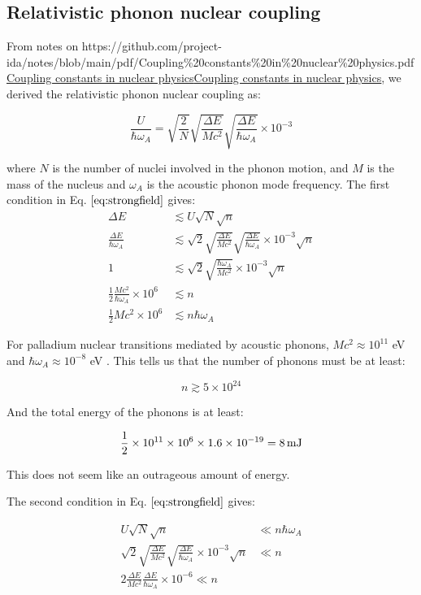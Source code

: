 \documentclass[
]{article}
\let\oldhref\href
\renewcommand{\href}[2]{\ifx#1\urlprefix\oldhref{#1}{#2}\else\uline{\oldhref{#1}{#2}}\fi}
\renewcommand{\[}{\begin{equation}}
\renewcommand{\]}{\end{equation}}
\begin{document}
\subsection{Relativistic phonon nuclear
coupling}\label{relativistic-phonon-nuclear-coupling}

From notes on
\href{https://github.com/project-ida/notes/blob/main/pdf/Coupling\%20constants\%20in\%20nuclear\%20physics.pdf}{Coupling
constants in nuclear physics}, we derived the relativistic phonon
nuclear coupling as:

\[
\frac{U}{\hbar \omega_A} = \sqrt{\frac{2}{N}} \sqrt{\frac{\Delta E}{M c^2}} \sqrt{\frac{\Delta E}{\hbar \omega_A}} \times 10^{-3}
\label{eq:phononcoupling}
\]

where \(N\) is the number of nuclei involved in the phonon motion, and
\(M\) is the mass of the nucleus and \(\omega_A\) is the acoustic phonon
mode frequency. The first condition in Eq. \(\ref{eq:strongfield}\)
gives: \[
\begin{aligned}
\Delta E &\lesssim U\sqrt{N}\sqrt{n} \\
\frac{\Delta E}{\hbar \omega_A} &\lesssim \sqrt{2} \sqrt{\frac{\Delta E}{M c^2}} \sqrt{\frac{\Delta E}{\hbar \omega_A}} \times 10^{-3}\sqrt{n} \\
1 &\lesssim \sqrt{2} \sqrt{\frac{\hbar\omega_A}{M c^2}} \times 10^{-3}\sqrt{n} \\
\frac{1}{2}\frac{Mc^2}{\hbar\omega_A}\times 10^6 &\lesssim n \\
\frac{1}{2}Mc^2\times 10^6  &\lesssim n\hbar\omega_A
\end{aligned}
\label{eq:strongfieldconditiononn}
\]

For palladium nuclear transitions mediated by acoustic phonons,
\(M c^2 \approx 10^{11}\) eV and \(\hbar \omega_A \approx 10^{-8}\) eV .
This tells us that the number of phonons must be at least:

\[
n \gtrsim 5\times 10^{24}
\]

And the total energy of the phonons is at least:

\[
\frac{1}{2}\times 10^{11} \times 10^{6} \times 1.6\times 10^{-19} = 8 \, \rm mJ
\label{eq:minfieldenergy}
\]

This does not seem like an outrageous amount of energy.

The second condition in Eq. \(\ref{eq:strongfield}\) gives:

\[
\begin{aligned}
U\sqrt{N}\sqrt{n} &\ll  n\hbar \omega_A \\
\sqrt{2} \sqrt{\frac{\Delta E}{M c^2}} \sqrt{\frac{\Delta E}{\hbar \omega_A}} \times 10^{-3}\sqrt{n} &\ll n \\
2\frac{\Delta E}{M c^2} \frac{\Delta E}{\hbar \omega_A} \times 10^{-6} \ll n
\end{aligned}
\]
\end{document}
